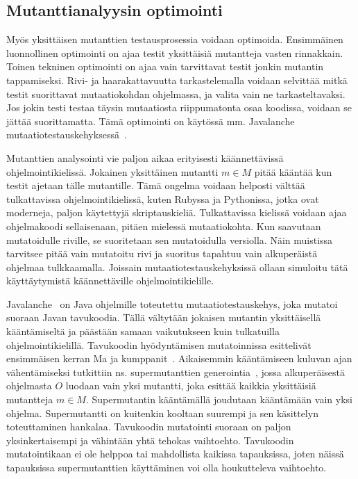 \documentclass[finnish]{tktltiki2}
\begin{document}
\subsection{Mutanttianalyysin optimointi}
Myös yksittäisen mutanttien testausprosessia voidaan optimoida. Ensimmäinen luonnollinen optimointi on ajaa testit yksittäisiä mutantteja vasten rinnakkain. Toinen tekninen optimointi on ajaa vain tarvittavat testit jonkin mutantin tappamiseksi. Rivi- ja haarakattavuutta tarkastelemalla voidaan selvittää mitkä testit suorittavat mutaatiokohdan ohjelmassa, ja valita vain ne tarkasteltavaksi. Jos jokin testi testaa täysin mutaatiosta riippumatonta osaa koodissa, voidaan se jättää suorittamatta. Tämä optimointi on käytössä mm. Javalanche mutaatiotestauskehyksessä~\cite{SchulerZ09}.

Mutanttien analysointi vie paljon aikaa erityisesti käännettävissä ohjelmointikielissä. Jokainen yksittäinen mutantti $m\in M$ pitää kääntää kun testit ajetaan tälle mutantille. Tämä ongelma voidaan helposti välttää tulkattavissa ohjelmointikielissä, kuten Rubyssa ja Pythonissa, jotka ovat moderneja, paljon käytettyjä skriptauskieliä. Tulkattavissa kielissä voidaan ajaa ohjelmakoodi sellaisenaan, pitäen mielessä mutaatiokohta. Kun saavutaan mutatoidulle riville, se suoritetaan sen mutatoidulla versiolla. Näin muistissa tarvitsee pitää vain mutatoitu rivi ja suoritus tapahtuu vain alkuperäistä ohjelmaa tulkkaamalla. Joissain mutaatiotestauskehyksissä ollaan simuloitu tätä käyttäytymistä käännettäville ohjelmointikielille. 

Javalanche~\cite{SchulerZ09} on Java ohjelmille toteutettu mutaatiotestauskehys, joka mutatoi suoraan Javan tavukoodia. Tällä vältytään jokaisen mutantin yksittäisellä kääntämiseltä ja päästään samaan vaikutukseen kuin tulkatuilla ohjelmointikielillä. Tavukoodin hyödyntämisen mutatoinnissa esittelivät ensimmäisen kerran Ma ja kumppanit~\cite{MaOK05}. Aikaisemmin kääntämiseen kuluvan ajan vähentämiseksi tutkittiin ns. supermutanttien generointia~\cite{}, jossa alkuperäisestä ohjelmasta $O$ luodaan vain yksi mutantti, joka esittää kaikkia yksittäisiä mutantteja $m\in M$. Supermutantin kääntämällä joudutaan kääntämään vain yksi ohjelma. Supermutantti on kuitenkin kooltaan suurempi ja sen käsittelyn toteuttaminen hankalaa. Tavukoodin mutatointi suoraan on paljon yksinkertaisempi ja vähintään yhtä tehokas vaihtoehto. Tavukoodin mutatointikaan ei ole helppoa tai mahdollista kaikissa tapauksissa, joten näissä tapauksissa supermutanttien käyttäminen voi olla houkutteleva vaihtoehto.
\end{document}
